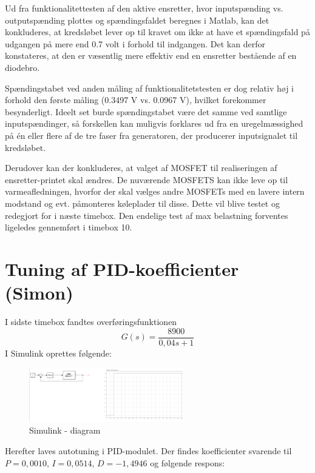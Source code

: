 Ud fra funktionalitettesten af den aktive ensretter, hvor inputspænding vs. outputspænding plottes og spændingsfaldet beregnes i Matlab, kan det konkluderes, at kredsløbet lever op til kravet om ikke at have et spændingsfald på udgangen på mere end 0.7 volt i forhold til indgangen.  Det kan derfor konstateres, at den er væsentlig mere effektiv end en ensretter bestående af en diodebro.   

Spændingstabet ved anden måling af funktionalitetstesten er dog relativ høj i forhold den første måling (0.3497 V vs. 0.0967 V), hvilket forekommer besynderligt. Ideelt set burde spændingstabet være det samme ved samtlige inputspændinger, så forskellen kan muligvis forklares ud fra en uregelmæssighed på én eller flere af de tre faser fra generatoren, der producerer inputsignalet til kredsløbet. 

Derudover kan der konkluderes, at valget af MOSFET til realiseringen af ensretter-printet skal ændres. De nuværende MOSFETS kan ikke leve op til varmeafledningen, hvorfor der skal vælges andre MOSFETs med en lavere intern modstand og evt. påmonteres køleplader til disse. 
Dette vil blive testet og redegjort for i næste timebox. Den endelige test af max belastning forventes ligeledes gennemført i timebox 10. 
    
\clearpage

\section{Tuning af PID-koefficienter (Simon)}
\label{sec:tuning-af-pid}

I sidste timebox fandtes overføringsfunktionen
\begin{equation}
  \label{eq:1}
G(s) = \frac{8900}{0,04s+1}  
\end{equation}
I Simulink oprettes følgende:

\begin{figure}[h]
  \centering
  \includegraphics[width=0.6\textwidth]{sbil1.png}
  \caption{Simulink - diagram}
  \label{fig:sbil1}
\end{figure}

Herefter laves autotuning i PID-modulet. Der findes koefficienter svarende til $P=0,0010$, $I=0,0514$, $D=-1,4946$ og følgende respons:

